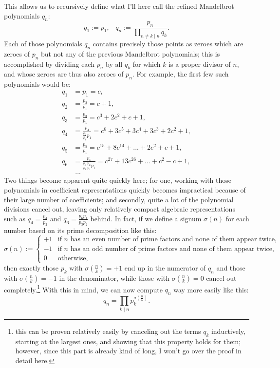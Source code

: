 \documentclass[12pt,a4paper]{article}
\begin{document}
This allows us to recursively define what I'll here call the refined Mandelbrot polynomials $q_n$: $$q_1:=p_1,\;\;\;q_n:=\frac{p_n}{\prod_{n\neq k\mid n}q_k}.$$
Each of those polynomials $q_n$ contains precisely those points as zeroes which are zeroes of $p_n$ but not any of the previous Mandelbrot polynomials; this is accomplished by dividing each $p_n$ by all $q_k$ for which $k$ is a proper divisor of $n$, and whose zeroes are thus also zeroes of $p_n$. For example, the first few such polynomials would be:
\begin{align*}
	q_1&=p_1=c,\\
	q_2&=\frac{p_2}{p_1}=c+1,\\
	q_3&=\frac{p_3}{p_1}=c^3+2c^2+c+1,\\
	q_4&=\frac{p_4}{\frac{p_2}{p_1}p_1}=c^6+3c^5+3c^4+3c^3+2c^2+1,\\
	q_5&=\frac{p_5}{p_1}=c^{15}+8c^{14}+...+2c^2+c+1,\\
	q_6&=\frac{p_6}{\frac{p_3}{p_1}\frac{p_2}{p_1}p_1}=c^{27}+13c^{26}+...+c^2-c+1,\\
	&\;...
\end{align*}
Two things become apparent quite quickly here; for one, working with those polynomials in coefficient representations quickly becomes impractical because of their large number of coefficients; and secondly, quite a lot of the polynomial divisions cancel out, leaving only relatively compact algebraic representations such as $q_4=\frac{p_4}{p_2}$ and $q_6=\frac{p_6p_1}{p_3p_2}$ behind. In fact, if we define a signum $\sigma(n)$ for each number based on its prime decomposition like this: $$\sigma(n):=\begin{cases}
	+1&\textrm{if $n$ has an even number of prime factors and none of them appear twice},\\
	-1&\textrm{if $n$ has an odd number of prime factors and none of them appear twice},\\
	0&\textrm{otherwise},
\end{cases}$$
then exactly those $p_k$ with $\sigma(\frac nk)=+1$ end up in the numerator of $q_n$ and those with $\sigma(\frac nk)=-1$ in the denominator, while those with $\sigma(\frac nk)=0$ cancel out completely.\footnote{this can be proven relatively easily by canceling out the terms $q_k$ inductively, starting at the largest ones, and showing that this property holds for them; however, since this part is already kind of long, I won't go over the proof in detail here.} With this in mind, we can now compute $q_n$ way more easily like this: $$q_n=\prod_{k\mid n}p_k^{\sigma(\frac nk)}.$$
\end{document}
